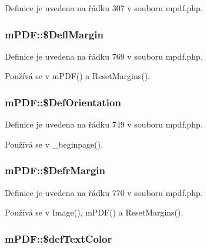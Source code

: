Definice je uvedena na řádku 307 v souboru mpdf.\-php.

\hypertarget{classm_p_d_f_a819ef96a3cfac488daed6c02a6173a1d}{
\subsubsection[{\$\-Defl\-Margin}]{\setlength{\rightskip}{0pt plus 5cm}m\-P\-D\-F\-::\$\-Defl\-Margin}}\label{classm_p_d_f_a819ef96a3cfac488daed6c02a6173a1d}


Definice je uvedena na řádku 769 v souboru mpdf.\-php.



Používá se v m\-P\-D\-F() a Reset\-Margins().

\hypertarget{classm_p_d_f_a5d3f2a23df13a63ba4361487560acf81}{
\subsubsection[{\$\-Def\-Orientation}]{\setlength{\rightskip}{0pt plus 5cm}m\-P\-D\-F\-::\$\-Def\-Orientation}}\label{classm_p_d_f_a5d3f2a23df13a63ba4361487560acf81}


Definice je uvedena na řádku 749 v souboru mpdf.\-php.



Používá se v \-\_\-beginpage().

\hypertarget{classm_p_d_f_a65d9a8a957651ef67b43ee98351384d3}{
\subsubsection[{\$\-Defr\-Margin}]{\setlength{\rightskip}{0pt plus 5cm}m\-P\-D\-F\-::\$\-Defr\-Margin}}\label{classm_p_d_f_a65d9a8a957651ef67b43ee98351384d3}


Definice je uvedena na řádku 770 v souboru mpdf.\-php.



Používá se v Image(), m\-P\-D\-F() a Reset\-Margins().

\hypertarget{classm_p_d_f_ad77ba75ba501ac80594f39b54f32c8c3}{
\subsubsection[{\$def\-Text\-Color}]{\setlength{\rightskip}{0pt plus 5cm}m\-P\-D\-F\-::\$def\-Text\-Color}}\label{classm_p_d_f_ad77ba75ba501ac80594f39b54f32c8c3}


